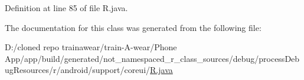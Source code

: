 Definition at line 85 of file R.\+java.



The documentation for this class was generated from the following file\+:\begin{DoxyCompactItemize}
\item 
D\+:/cloned repo trainawear/train-\/\+A-\/wear/\+Phone App/app/build/generated/not\+\_\+namespaced\+\_\+r\+\_\+class\+\_\+sources/debug/process\+Debug\+Resources/r/android/support/coreui/\mbox{\hyperlink{process_debug_resources_2r_2android_2support_2coreui_2_r_8java}{R.\+java}}\end{DoxyCompactItemize}
